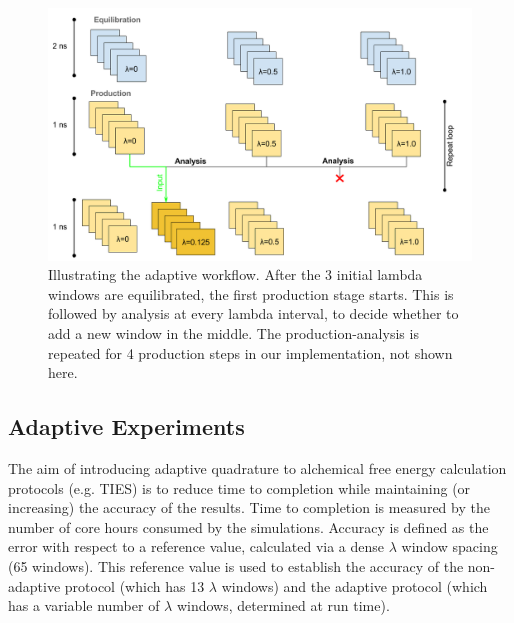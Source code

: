 \begin{figure}
  \centering
   \includegraphics[width=\columnwidth]{figures/Adaptive_TIES_1.png}
  \caption{Illustrating the adaptive workflow. After the 3 initial lambda 
  windows are equilibrated, the first production stage starts. 
  This is followed by analysis at every lambda interval, to decide whether 
  to add a new window in the middle. The production-analysis is repeated 
  for 4 production steps in our implementation, not shown here.}
\label{fig:adaptive_TIES}
\end{figure}




\subsection{Adaptive Experiments}

 

The aim of introducing adaptive quadrature to alchemical free energy 
calculation protocols (e.g. TIES) is to reduce time to completion while 
maintaining (or increasing) the accuracy of the results. Time to completion is 
measured by the number of core hours consumed by the simulations. Accuracy is 
defined as the error with respect to a reference value, calculated via a dense 
$\lambda$ window spacing (65 windows). This reference value is used to establish 
the accuracy of the non-adaptive protocol (which has 13 $\lambda$ windows) and 
the adaptive protocol (which has a variable number of $\lambda$ windows, 
determined at run time).

